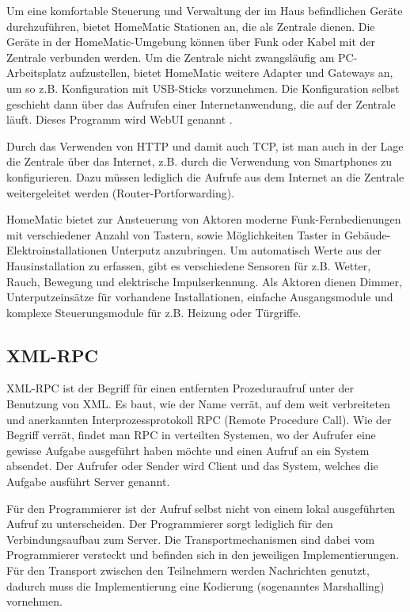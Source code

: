 Um eine komfortable Steuerung und Verwaltung der im Haus befindlichen Geräte durchzuführen,
bietet HomeMatic Stationen an, die als Zentrale dienen.
Die Geräte in der HomeMatic-Umgebung können über Funk oder Kabel mit der Zentrale verbunden
werden.
Um die Zentrale nicht zwangsläufig am PC-Arbeitsplatz aufzustellen, bietet HomeMatic weitere
Adapter und Gateways an, um so z.B. Konfiguration mit USB-Sticks vorzunehmen.
Die Konfiguration selbst geschieht dann über das Aufrufen einer Internetanwendung, die
auf der Zentrale läuft.
Dieses Programm wird WebUI genannt \cite{homematic_webui_manual}.

Durch das Verwenden von HTTP und damit auch TCP, ist man auch in der Lage die Zentrale
über das Internet, z.B. durch die Verwendung von Smartphones zu konfigurieren.
Dazu müssen lediglich die Aufrufe aus dem Internet an die Zentrale weitergeleitet werden
(Router-Portforwarding).

HomeMatic bietet zur Ansteuerung von Aktoren moderne Funk-Fernbedienungen mit verschiedener
Anzahl von Tastern, sowie Möglichkeiten Taster in Gebäude-Elektroinstallationen Unterputz anzubringen.
Um automatisch Werte aus der Hausinstallation zu erfassen, gibt es verschiedene Sensoren für z.B.
Wetter, Rauch, Bewegung und elektrische Impulserkennung.
Als Aktoren dienen Dimmer, Unterputzeinsätze für vorhandene Installationen, einfache Ausgangsmodule und
komplexe Steuerungsmodule für z.B. Heizung oder Türgriffe.

\subsection{XML-RPC}
\label{gru_xmlrpc}

XML-RPC ist der Begriff für einen entfernten Prozeduraufruf unter der Benutzung von XML.
Es baut, wie der Name verrät, auf dem weit verbreiteten und anerkannten Interprozessprotokoll RPC
(Remote Procedure Call).
Wie der Begriff verrät, findet man RPC in verteilten Systemen, wo der Aufrufer eine gewisse
Aufgabe ausgeführt haben möchte und einen Aufruf an ein System absendet.
Der Aufrufer oder Sender wird Client und das System, welches die Aufgabe ausführt Server genannt.


Für den Programmierer ist der Aufruf selbst nicht von einem lokal ausgeführten Aufruf zu unterscheiden.
Der Programmierer sorgt lediglich für den Verbindungsaufbau zum Server.
Die Transportmechanismen sind dabei vom Programmierer versteckt und befinden sich in den jeweiligen
Implementierungen.
Für den Transport zwischen den Teilnehmern werden Nachrichten genutzt, dadurch muss die Implementierung
eine Kodierung (sogenanntes Marshalling) vornehmen.

